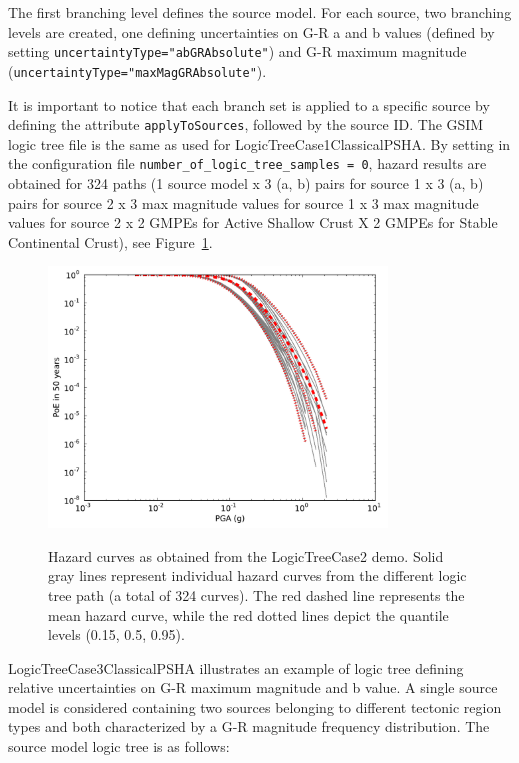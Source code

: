 The first branching level defines the source model. For each source, two
branching levels are created, one defining uncertainties on G-R a and b values
(defined by setting \texttt{uncertaintyType="abGRAbsolute"}) and G-R maximum
magnitude (\texttt{uncertaintyType="maxMagGRAbsolute"}).

It is important to notice that each branch set is applied to a specific source
by defining the attribute \texttt{apply\-To\-Sources}, followed by the source
ID. The GSIM logic tree file is the same as used for
LogicTreeCase1ClassicalPSHA. By setting in the configuration file
\texttt{number\_\-of\_\-logic\_\-tree\_\-samples = 0}, hazard results are
obtained for 324 paths (1 source model x 3 (a, b) pairs for source 1 x 3 (a,
b) pairs for source 2 x 3 max magnitude values for source 1 x 3 max magnitude
values for source 2 x 2 GMPEs for Active Shallow Crust X 2 GMPEs for Stable
Continental Crust), see Figure~\ref{fig:hazard_curves}.


\begin{figure}
\centering
\subcaptionbox{}
{\includegraphics[width=9cm]{figures/hazard/hazard-curves-ltcase2.pdf}} 
\caption{Hazard curves as obtained from the LogicTreeCase2 demo. Solid gray 
    lines represent individual hazard curves from the different
    logic tree path (a total of 324 curves). The red dashed line represents the
    mean hazard curve, while the red dotted lines depict the quantile levels
    (0.15, 0.5, 0.95).}
\label{fig:hazard_curves}
\end{figure}

LogicTreeCase3ClassicalPSHA illustrates an example of logic tree defining
relative uncertainties on G-R maximum magnitude and b value. A single source
model is considered containing two sources belonging to different tectonic
region types and both characterized by a G-R magnitude frequency distribution.
The source model logic tree is as follows:

